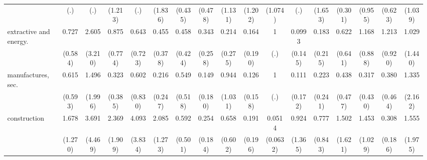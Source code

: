 {\begin{tabular}{l*{16}{c}}
                    &         (.)         &         (.)         &     (1.213)         &         (.)         &     (1.836)         &     (0.435)         &     (0.478)         &     (1.131)         &     (1.202)         &     (1.074)         &         (.)         &     (1.653)         &     (0.301)         &     (0.955)         &     (0.623)         &     (1.039)         \\
[1em]
extractive and energy.&       0.727         &       2.605         &       0.875         &       0.643         &       0.455         &       0.458         &       0.343         &       0.214         &       0.164         &           1         &      0.0993         &       0.183         &       0.622         &       1.168         &       1.213         &       1.029         \\
                    &     (0.584)         &     (3.210)         &     (0.774)         &     (0.723)         &     (0.378)         &     (0.424)         &     (0.258)         &     (0.275)         &     (0.190)         &         (.)         &     (0.145)         &     (0.215)         &     (0.641)         &     (0.888)         &     (0.920)         &     (1.440)         \\
[1em]
manufactures, sec.  &       0.615         &       1.496         &       0.323         &       0.602         &       0.216         &       0.549         &       0.149         &       0.944         &       0.126         &           1         &       0.111         &       0.223         &       0.438         &       0.317         &       0.380         &       1.335         \\
                    &     (0.593)         &     (1.996)         &     (0.385)         &     (0.830)         &     (0.247)         &     (0.518)         &     (0.180)         &     (1.031)         &     (0.158)         &         (.)         &     (0.172)         &     (0.241)         &     (0.477)         &     (0.430)         &     (0.464)         &     (2.162)         \\
[1em]
construction        &       1.678         &       3.691         &       2.369         &       4.093         &       2.085         &       0.592         &       0.254         &       0.658         &       0.191         &      0.0514\sym{*}  &       0.924         &       0.777         &       1.502         &       1.453         &       0.308         &       1.555         \\
                    &     (1.270)         &     (4.469)         &     (1.909)         &     (3.834)         &     (1.273)         &     (0.501)         &     (0.184)         &     (0.602)         &     (0.196)         &    (0.0632)         &     (1.365)         &     (0.843)         &     (1.621)         &     (1.029)         &     (0.186)         &     (1.975)         \\

\end{tabular}}
